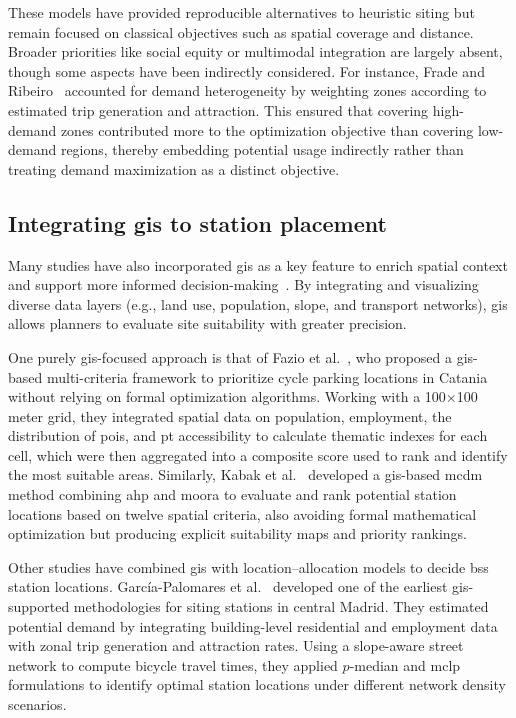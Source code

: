 These models have provided reproducible alternatives to heuristic siting but remain focused on classical objectives such as spatial coverage and distance. Broader priorities like social equity or multimodal integration are largely absent, though some aspects have been indirectly considered. For instance, Frade and Ribeiro~\cite{Frade2015} accounted for demand heterogeneity by weighting zones according to estimated trip generation and attraction. This ensured that covering high-demand zones contributed more to the optimization objective than covering low-demand regions, thereby embedding potential usage indirectly rather than treating demand maximization as a distinct objective.


\subsection[Integrating GIS to station placement]{Integrating \ac{gis} to station placement} \label{sec:integrating_gis_to_station_placement}

Many studies have also incorporated \ac{gis} as a key feature to enrich spatial context and support more informed decision-making~\cite{Fazio2021, Kabak2018, GarciaPalomares2012, Chou2019, Tera2023, Ebrahimi2022}. By integrating and visualizing diverse data layers (e.g., land use, population, slope, and transport networks), \ac{gis} allows planners to evaluate site suitability with greater precision.

One purely \ac{gis}-focused approach is that of Fazio et al.~\cite{Fazio2021}, who proposed a \ac{gis}-based multi-criteria framework to prioritize cycle parking locations in Catania without relying on formal optimization algorithms. Working with a 100×100 meter grid, they integrated spatial data on population, employment, the distribution of \acp{poi}, and \ac{pt} accessibility to calculate thematic indexes for each cell, which were then aggregated into a composite score used to rank and identify the most suitable areas. Similarly, Kabak et al.~\cite{Kabak2018} developed a \ac{gis}-based \ac{mcdm} method combining \ac{ahp} and \ac{moora} to evaluate and rank potential station locations based on twelve spatial criteria, also avoiding formal mathematical optimization but producing explicit suitability maps and priority rankings.

Other studies have combined \ac{gis} with location–allocation models to decide \ac{bss} station locations. García-Palomares et al.~\cite{GarciaPalomares2012} developed one of the earliest \ac{gis}-supported methodologies for siting stations in central Madrid. They estimated potential demand by integrating building-level residential and employment data with zonal trip generation and attraction rates. Using a slope-aware street network to compute bicycle travel times, they applied $p$-median and \ac{mclp} formulations to identify optimal station locations under different network density scenarios.

